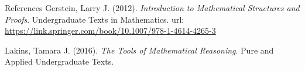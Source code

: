 \documentclass [aspectratio=169]{beamer}
\begin{document}
\begin{frame}{References}
Gerstein, Larry J. (2012). \textit{Introduction to Mathematical Structures and Proofs}. Undergraduate Texts in Mathematics. url: \href{https://link.springer.com/book/10.1007/978-1-4614-4265-3}{https://link.springer.com/book/10.1007/978-1-4614-4265-3}


\vspace{1em}

Lakins, Tamara J. (2016). \textit{The Tools of Mathematical Reasoning}. Pure and Applied Undergraduate Texts. 

\end{frame}
\end{document}
